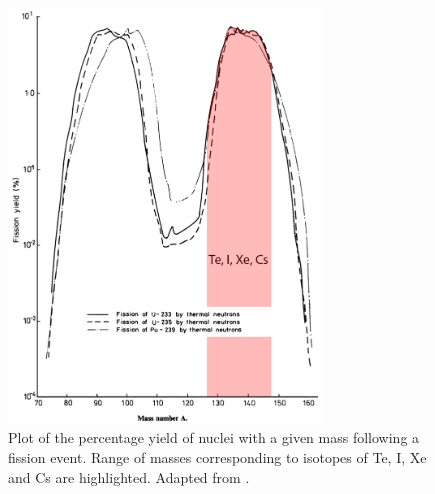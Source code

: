 \documentclass[11pt,a4paper]{article}
\begin{document}
\appendix

\begin{figure}
    \centering
    \includegraphics[height=11cm]{img/fissionyield.png}
    \caption{Plot of the percentage yield of nuclei with a given mass following a fission event. Range of masses corresponding to isotopes of Te, I, Xe and Cs are highlighted. Adapted from \cite{England1992OECDReport}.}
    \label{fig:fissionyield}
\end{figure}
\end{document}

